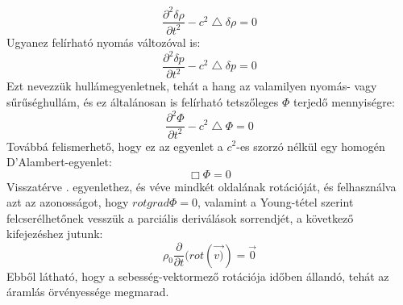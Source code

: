 \documentclass[a4paper, titlepage]{article}
\begin{document}
\begin{equation}
\frac{\partial^2 \delta\rho}{\partial t^2}-c^2\bigtriangleup\delta\rho=0
\end{equation}
Ugyanez felírható nyomás változóval is:
\begin{equation}
\frac{\partial^2 \delta p}{\partial t^2}-c^2\bigtriangleup\delta p=0
\end{equation}
Ezt nevezzük hullámegyenletnek, tehát a hang az valamilyen nyomás- vagy sűrűséghullám, és ez általánosan is felírható tetszőleges $\Phi$ terjedő mennyiségre:
$$
\frac{\partial^2 \Phi}{\partial t^2}-c^2\bigtriangleup\Phi=0
$$
Továbbá felismerhető, hogy ez az egyenlet a $c^2$-es szorzó nélkül egy homogén D'Alambert-egyenlet:
$$
\Box \Phi=0
$$
Visszatérve . egyenlethez, és véve mindkét oldalának rotációját, és felhasználva azt az azonosságot, hogy $rotgrad\Phi=0$, valamint a Young-tétel szerint felcserélhetőnek vesszük a parciális deriválások sorrendjét, a következő kifejezéshez jutunk:
\begin{equation}
\rho_0 \frac{\partial}{\partial t}(rot(\vec{v)})=\vec{0}
\end{equation}
Ebből látható, hogy a sebesség-vektormező rotációja időben állandó, tehát az áramlás örvényessége megmarad.
\end{document}
